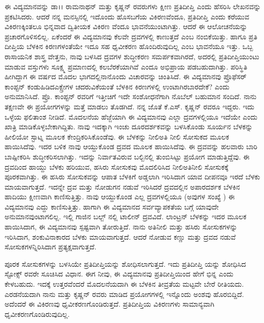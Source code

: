 ಈ ವಿದ್ಯಮಾನವನ್ನು ಡಾ।। ರಾಮನಾಥನ್ ಮತ್ತು ಕೃಷ್ಣನ್ ರವರುಗಳು ಕ್ಷೀಣ ಪ್ರತಿದೀಪ್ತಿ ಎಂದು ಹೆಸರಿಸಿ ಲೇಖನವನ್ನು ಪ್ರಕಟಿಸಿದರು. ಆದರೆ ನನ್ನ ಮನಸ್ಸಿನಲ್ಲಿ ಇದೊಂದು ಹೊಸಬಗೆಯ ವಿಕಿರಣವೆಂದೂ, ಪ್ರತಿದೀಪ್ತಿ ಎಂದು ಕರೆಯುವ ವಿಕಿರಣಕ್ಕಿಂತಲೂ ಭಿನ್ನವಾದ ದ್ವಿತೀಯಕ ವಿಕಿರಣ\-
ವೆಂದೂ ಭಾವನೆಯುಂಟಾಗಿತ್ತು. ಆದರೆ ಈ ಆಲೋಚನೆಯನ್ನು ಪ್ರಚಾರಗೊಳಿಸಲಿಲ್ಲ. ಏಕೆಂದರೆ ಈ ವಿದ್ಯಮಾನವು ಕೆಲವೇ ದ್ರವಗಳಲ್ಲಿ ಕಾಣುತ್ತದೆ ಎಂಬ ನಂಬಿಕೆಯಿತ್ತು. ಹಾಗೂ ಪ್ರತಿ ದೀಪ್ತಿಯ ಬೆಳಕಿನ ಕಿರಣಗಳಂತೆಯೇ ಇದೂ ಸಹ ಧೃವೀಕರಣ ಹೊಂದಿರುವುದಿಲ್ಲ ಎಂಬ ಭಾವನೆಯೂ ಇತ್ತು. ಒಬ್ಬ ರಾಸಾಯನಿಕ ಶಾಸ್ತ್ರ ವೇತ್ತನು, ನಾವು ಬಳಸಿದ ದ್ರವಗಳ ಶುದ್ಧೀಕರಣ ಸಮರ್ಪಕವಾಗಿರದೆ, ಅದರಲ್ಲಿ ಪ್ರತಿದೀಪ್ತಿಯುಂಟು ಮಾಡುವ ವಸ್ತುಗಳು ಸೂಕ್ಷ್ಮ ಪ್ರಮಾಣದಲ್ಲಿ ಕಲಬೆರಕೆಯಾಗಿವೆ ಎಂದೂ ಅಭಿಪ್ರಾಯ ಪಡಬಹುದಾಗಿತ್ತು. ಪರಿಸ್ಥಿತಿ ಹೀಗಿದ್ದಾಗ ಈ ವರ್ಷದ ಮೊದಲ ಭಾಗದಲ್ಲಿ\break ನಾನೊಂದು ವಿಚಾರವನ್ನು ಚಿಂತಿಸಿದೆ. ಈ ವಿದ್ಯಮಾನವು ಪ್ರೊಫೆಸರ್ ಕಾಂಪ್ಟನ್ ಕಂಡುಹಿಡಿದ\break ಎಕ್ಸ್\enginline{--}ರೇಗಳ ಚದರುವಿಕೆಯಂತೆ ಬೆಳಕಿನ ಕಿರಣಗಳಲ್ಲಿ ಉಂಟಾಗಿರಬಾರದೇಕೆ? ಎಂದು ಅನುಮಾನಿ\break ಸಿದೆ. ಪ್ರೊ. ಕಾಂಪ್ಟನ್ ರವರಿಗೆ ಇತ್ತೀಚಿಗೆ ಇದೇ ಸಂಶೋಧನೆಗಾಗಿ ನೊಬೆಲ್ ಬಹುಮಾನ ಸಂದಿದೆ. ನಾನು ತಕ್ಷಣವೇ ಈ ಪ್ರಯೋಗಗಳನ್ನು ಮತ್ತೆ ಮಾಡಲು ತೊಡಗಿದೆ. ನನ್ನ ಜೊತೆ ಕೆ.ಎಸ್. ಕೃಷ್ಣನ್ ರವರೂ ಇದ್ದರು. ಇದು ಒಳ್ಳೆಯ ಫಲಿತಾಂಶ ನೀಡಿದೆ. ಮೊದಲನೆಯ ಹೆಜ್ಜೆಯಾಗಿ ಈ ವಿದ್ಯಮಾನವು ಎಲ್ಲಾ ದ್ರವಗಳಲ್ಲಿಯೂ ಇದೆಯೇ ಎಂದು ಖಾತ್ರಿ ಮಾಡಿಕೊಳ್ಳಬೇಕಾಗಿದ್ದಿತು. ನಾವು ಇದಕ್ಕಾಗಿ  ಇಂಚು ದೂರದರ್ಶಕವನ್ನು ಬಳಸಿಕೊಂಡು ಸೂರ್ಯನ ಬೆಳಕನ್ನು ಹೀಲಿಯೋ ಸ್ಟಾಟ್ನ ಮೂಲಕ ಕೇಂದ್ರಿಕರಿಸಿಕೊಂಡೆವು. ಈ ಬೆಳಕನ್ನು ನೀಲಿ\enginline{--}ಅತಿ ನೀಲಿ ಸೋಸುಕದ ಮೂಲಕ ಹಾಯಿಸಿದೆವು. ಇದರ ಬಳಿಕ ನಾವು ಆಯ್ದುಕೊಂಡ ದ್ರವದ ಮೂಲಕ ಹಾಯಿಸಿದೆವು. ಈ ದ್ರವವನ್ನು ಹಲವಾರು ಬಾರಿ ಬಾಷ್ಪೀಕರಿಸಿ ಶುದ್ಧೀಕರಿಸಲಾಗಿತ್ತು. ಇದನ್ನು ನಿರ್ವಾತವಿರುವ ಬಲ್ಬಿನಲ್ಲಿ ತುಂಬಿಸಿಟ್ಟು ಪ್ರಯೋಗ ಮಾಡುತ್ತಿದ್ದೆವು. ಈ ದ್ರವದಿಂದ ಹಾಯ್ದು ಬೆಳಕು ಹರಿಯುವ, ಹಸಿರು ಸೋಸುಕವು ಮೊದಲಿರಿಸಿದ ನೀಲಿ\enginline{--}ಅತಿನೀಲಿ ಸೋಸುಕಕ್ಕೆ ಪೂರಕವಾಗಿತ್ತು. ಈ ಹಸಿರು ಸೋಸುಕವನ್ನು ಆಪಾತ ಬೆಳಕಿಗೆ ಅಡ್ಡಲಾಗಿ ಇರಿಸಿದಾಗ ಯಾವ ದೀಪನವೂ ಇರದೆ ಬೆಳಕು ಮಾಯವಾಗುತ್ತದೆ. ಇದನ್ನೇ ದ್ರವ ಮತ್ತು ನೋಡುಗನ ನಡುವೆ ಇರಿಸಿದರೆ ದ್ರವದಲ್ಲಿನ ಅಪಾರದರ್ಶಕ ಬೆಳಕಿನ ಹಾದಿಯು ಕ್ಷೀಣವಾಗಿ ಕಾಣಿಸುತ್ತಿತ್ತು. ನಾವು ಆಯ್ದುಕೊಂಡ ಎಲ್ಲ ದ್ರವಗಳಲ್ಲಿಯೂ (ಅವುಗಳ ಸಂಖ್ಯೆ ) ಈ ವಿದ್ಯಮಾನವು ಎದ್ದು ಕಾಣಿಸುತ್ತಿತ್ತು. ಹಾಗಾಗಿ ಈ ವಿದ್ಯಮಾನದ ಸರ್ವವ್ಯಾಪಕತೆಯ ಬಗ್ಗೆ ಯಾವುದೇ ಅನುಮಾನವುಂಟಾಗಲಿಲ್ಲ. ಇಲ್ಲಿ ಗಾಜಿನ ಬಲ್ಬ್ ನಲ್ಲಿ ಟಾಲೀನ್ ದ್ರವವಿದೆ. ಲಾಂಟ್ರನ್ ಬೆಳಕನ್ನು ಇದರ ಮೂಲಕ ಹಾಯಿಸಿದಾಗ, ಈ ವಿದ್ಯಮಾನವು ಸ್ಪಷ್ಟವಾಗಿ ತೋರುತ್ತಿದೆ. ನಾನು ಅತಿನೀಲಿ ಮತ್ತು ಹಸಿರು ಸೋಸುಕಗಳನ್ನು ಇರಿಸಿದಾಗ, ಶಂಕುವಿನಾಕಾರದ ಬೆಳಕು ಮಾಯವಾಗುತ್ತದೆ. ಆದರೆ ನೋಡುವ ಕಣ್ಣು ಮತ್ತು ದ್ರವದ ನಡುವೆ ಸೋಸುಕಗಳನ್ನಿರಿಸಿದಾಗ ಪ್ರತ್ಯಕ್ಷವಾಗುತ್ತದೆ.

ಪೂರಕ ಸೋಸುಕಗಳನ್ನು ಬಳಸಿಯೇ ಪ್ರತಿದೀಪ್ತಿಯನ್ನು ಶೋಧಿಸಲಾಗುತ್ತದೆ. ಇದು ಪ್ರತಿದೀಪ್ತಿ\- ಯನ್ನು ಶೋಧಿಸಿದ ಸ್ಟೋಕ್ಸ್ ರವರೇ ಸೂಚಿಸಿದ ವಿಧಾನ. ಈಗ ನೀವು, ಈ ವಿದ್ಯಮಾನವು ಪ್ರತಿದೀಪ್ತಿಯಿಂದ ಹೇಗೆ ಭಿನ್ನ ಎಂದು ಕೇಳಬಹುದು. ಇದಕ್ಕೆ ಉತ್ತರವೆಂದರೆ\enginline{--} ಮೊದಲನೆಯದಾಗಿ ಈ ಬೆಳಕಿನ ತೀವ್ರತೆಯ ಮಟ್ಟವೇ ಬೇರೆ ರೀತಿಯದು. ಎರಡನೆಯದಾಗಿ ನಾನು ಮತ್ತು ಕೃಷ್ಣನ್ ರವರು ಮಾಡಿದ ಪ್ರಯೋಗಗಳಲ್ಲಿ ಇನ್ನೊಂದು ಅಂಶವು ಹೊರಬಿದ್ದಿದೆ. ಅದೆಂದರೆ ಈ ವಿಕಿರಣವು ಧೃವೀಕರಣಗೊಂಡಿರುತ್ತದೆ. ಪ್ರತಿದೀಪ್ತಿಯ ವಿಕಿರಣಗಳು ಸಾಮಾನ್ಯವಾಗಿ ಧೃವೀಕರಣಗೊಂಡಿರು\-ವುದಿಲ್ಲ.

